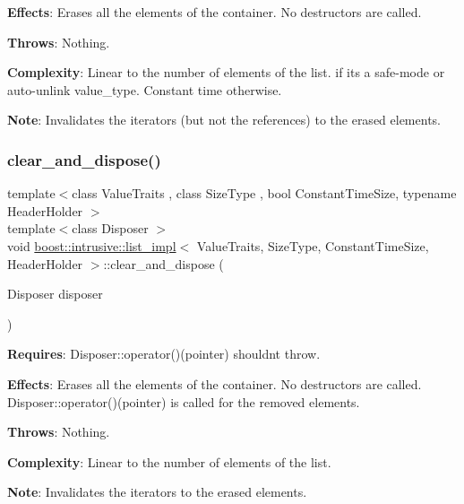 {\bfseries Effects}\+: Erases all the elements of the container. No destructors are called.

{\bfseries Throws}\+: Nothing.

{\bfseries Complexity}\+: Linear to the number of elements of the list. if it\textquotesingle{}s a safe-\/mode or auto-\/unlink value\+\_\+type. Constant time otherwise.

{\bfseries Note}\+: Invalidates the iterators (but not the references) to the erased elements. \mbox{\label{classboost_1_1intrusive_1_1list__impl_a0b07cfbe98383d57a8c27a8e389c13fc}} 
\subsubsection{\texorpdfstring{clear\+\_\+and\+\_\+dispose()}{clear\_and\_dispose()}}
{\footnotesize\ttfamily template$<$class Value\+Traits , class Size\+Type , bool Constant\+Time\+Size, typename Header\+Holder $>$ \\
template$<$class Disposer $>$ \\
void \hyperlink{classboost_1_1intrusive_1_1list__impl}{boost\+::intrusive\+::list\+\_\+impl}$<$ Value\+Traits, Size\+Type, Constant\+Time\+Size, Header\+Holder $>$\+::clear\+\_\+and\+\_\+dispose (\begin{DoxyParamCaption}\item[{Disposer}]{disposer }\end{DoxyParamCaption})\hspace{0.3cm}{\ttfamily [inline]}}

{\bfseries Requires}\+: Disposer\+::operator()(pointer) shouldn\textquotesingle{}t throw.

{\bfseries Effects}\+: Erases all the elements of the container. No destructors are called. Disposer\+::operator()(pointer) is called for the removed elements.

{\bfseries Throws}\+: Nothing.

{\bfseries Complexity}\+: Linear to the number of elements of the list.

{\bfseries Note}\+: Invalidates the iterators to the erased elements. \mbox{\label{classboost_1_1intrusive_1_1list__impl_afd28996ec25e7c810d7c867e66e1fa3e}} 
